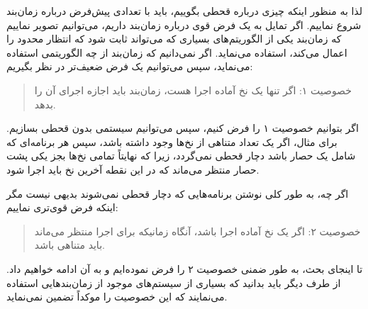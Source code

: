 \documentclass{book}
\begin{document}
    لذا به منظور اینکه چیزی درباره قحطی بگوییم،‌ باید با تعدادی پیش‌فرض درباره زمان‌بند شروع نماییم. 
    اگر تمایل به یک فرض قوی درباره زمان‌بند داریم، 
    می‌توانیم تصویر نماییم که زمان‌بند یکی از الگوریتم‌های بسیاری که می‌تواند ثابت شود که انتظار محدود را اعمال می‌کند، استفاده می‌نماید. 
    اگر نمی‌دانیم که زمان‌بند از چه الگوریتمی استفاده می‌نماید، سپس می‌توانیم یک فرض ضعیف‌تر در نظر بگیریم: 

\begin{quote}
    خصوصیت ۱: اگر تنها یک نخ آماده اجرا هست، زمان‌بند باید اجازه اجرای آن را بدهد. 
\end{quote}

    اگر بتوانیم خصوصیت ۱ را فرض کنیم، سپس می‌توانیم سیستمی بدون قحطی بسازیم.
    برای مثال، اگر یک تعداد متناهی از نخ‌ها وجود داشته باشد، سپس هر برنامه‌ای که شامل یک حصار باشد دچار قحطی نمی‌گردد، زیرا که 
    نهایتاً تمامی نخ‌ها بجز یکی پشت حصار منتظر می‌ماند که در این نقطه آخرین نخ باید اجرا شود. 

    اگر چه، به طور کلی نوشتن برنامه‌هایی که دچار قحطی نمی‌شوند بدیهی نیست مگر اینکه فرض قوی‌تری نماییم:

\begin{quote}
    خصوصیت ۲: اگر یک نخ آماده اجرا باشد، آنگاه زمانیکه برای اجرا منتظر می‌ماند باید متناهی باشد. 
\end{quote}

    تا  اینجای بحث، به طور ضمنی خصوصیت ۲ را فرض نموده‌ایم و به آن ادامه خواهیم داد. 
    از طرف دیگر باید بدانید که بسیاری از سیستم‌های موجود از زمان‌بندهایی استفاده می‌نمایند که این خصوصیت را موکداً تضمین نمی‌نماید. 
\end{document}
